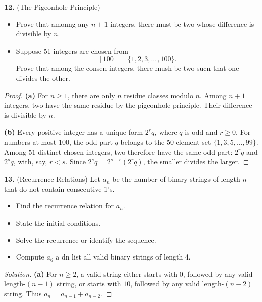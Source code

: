 \documentclass[12pt]{amsart}
\newenvironment{solution}
{\begin{proof}[Solution]}
{\end{proof}}
\begin{document}
\begin{onehalfspace}
        \noindent\textbf{12.} (The Pigeonhole Principle)
        \begin{itemize}
            \item[(a)] Prove that amonng any $n + 1$ integers, there must be two whose difference is
            divisible by $n$.
            \item[(b)] Suppose 51 integers are chosen from
            \[
                [100] = \{1, 2, 3, \ldots, 100\}.
            \]
            Prove that among the consen integers, there mush be two sucn that one divides the other.
        \end{itemize}

        \begin{proof}
            \textbf{(a)} For $n\ge1$, there are only $n$ residue classes
            modulo $n$. Among $n+1$ integers, two have the same residue
            by the pigeonhole principle. Their difference is divisible by $n$.

            \textbf{(b)} Every positive integer has a unique form $2^r q$,
            where $q$ is odd and $r\ge0$. For numbers at most $100$,
            the odd part $q$ belongs to the $50$-element set
            $\{1,3,5,\ldots,99\}$. Among $51$ distinct chosen integers,
            two therefore have the same odd part: $2^r q$ and $2^s q$,
            with, say, $r<s$. Since
            $2^s q=2^{s-r}(2^r q)$, the smaller divides the larger.
        \end{proof}

        \noindent\textbf{13.} (Recurrence Relations) Let $a_n$ be the number of binary strings of
        length $n$ that do not contain consecutive 1's.
        \begin{itemize}
            \item[(a)] Find the recurrence relation for $a_n$.
            \item[(b)] State the initial conditions.
            \item[(c)] Solve the recurrence or identify the sequence.
            \item[(d)] Compute $a_6$ a dn list all valid binary strings of length 4.
        \end{itemize}

        \begin{solution}
            \textbf{(a)} For $n\ge2$, a valid string either starts with
            $0$, followed by any valid length-$(n-1)$ string, or starts
            with $10$, followed by any valid length-$(n-2)$ string.
            Thus $a_n=a_{n-1}+a_{n-2}$.


\end{solution}
\end{onehalfspace}
\end{document}
